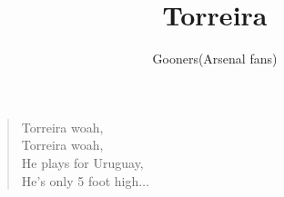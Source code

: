\documentclass[a4paper,12pt]{article}
\title{Torreira}
\author{Gooners(Arsenal fans)}
\date{}
\begin{document}
	
	\maketitle
	
	\begin{verse}
		
		Torreira woah, \\
		Torreira woah, \\
		He plays for Uruguay, \\
		He's only 5 foot high$\ldots$
		
	\end{verse}
	
\end{document}
